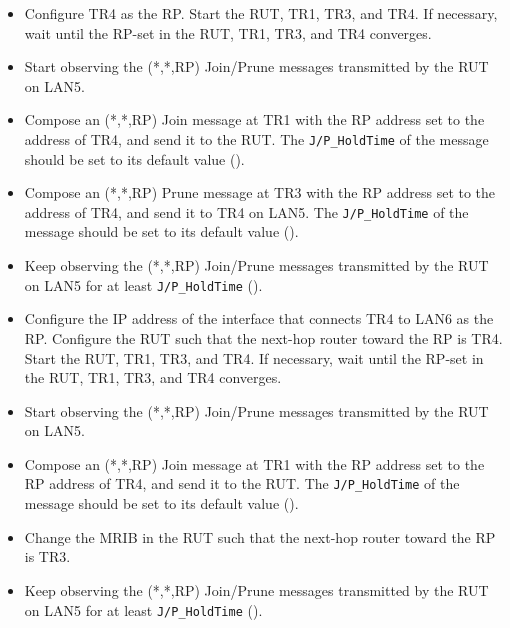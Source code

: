 \documentclass[11pt]{report}
\begin{document}
\begin{itemize}

  \item Configure TR4 as the RP. Start the RUT, TR1, TR3, and TR4. If
  necessary, wait until the RP-set in the RUT, TR1, TR3, and TR4
  converges.

  \item Start observing the (*,*,RP) Join/Prune messages transmitted by the
  RUT on LAN5.

  \item Compose an (*,*,RP) Join message at TR1 with the RP address set to the
  address of TR4, and send it to the RUT. 
  The \verb=J/P_HoldTime= of the message should be set to its default
  value ({\PimsmJPHoldTime}).

  \item Compose an (*,*,RP) Prune message at TR3 with the RP address set to the
  address of TR4, and send it to TR4 on LAN5.
  The \verb=J/P_HoldTime= of the message should be set to its default
  value ({\PimsmJPHoldTime}).

  \item Keep observing the (*,*,RP) Join/Prune messages transmitted by the
  RUT on LAN5 for at least \verb=J/P_HoldTime= ({\PimsmJPHoldTime}).

\end{itemize}


\begin{itemize}

  \item Configure the IP address of the interface that connects TR4 to LAN6 as
  the RP. Configure the RUT such that the next-hop router toward the RP is
  TR4. Start the RUT, TR1, TR3, and TR4. If necessary, wait until the
  RP-set in the RUT, TR1, TR3, and TR4 converges.

  \item Start observing the (*,*,RP) Join/Prune messages transmitted by the
  RUT on LAN5.

  \item Compose an (*,*,RP) Join message at TR1 with the RP address set to the
  RP address of TR4, and send it to the RUT. 
  The \verb=J/P_HoldTime= of the message should be set to its default
  value ({\PimsmJPHoldTime}).

  \item Change the MRIB in the RUT such that the next-hop
  router toward the RP is TR3.

  \item Keep observing the (*,*,RP) Join/Prune messages transmitted by the
  RUT on LAN5 for at least \verb=J/P_HoldTime= ({\PimsmJPHoldTime}).

\end{itemize}
\end{document}
